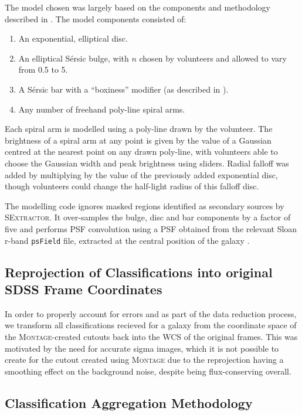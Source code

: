 \documentclass[../main.tex]{subfiles}
\begin{document}
The model chosen was largely based on the components and methodology described in \citet{galfit-paper}. The model components consisted of:
\begin{enumerate}
\item An exponential, elliptical disc.
\item An elliptical S\'ersic bulge, with $n$ chosen by volunteers and allowed to vary from 0.5 to 5.
\item A S\'ersic bar with a ``boxiness'' modifier (as described in \citealt{galfit-paper}).
\item Any number of freehand poly-line spiral arms.
\end{enumerate}

Each spiral arm is modelled using a poly-line drawn by the volunteer. The brightness of a spiral arm at any point is given by the value of a Gaussian centred at the nearest point on any drawn poly-line, with volunteers able to choose the Gaussian width and peak brightness using sliders. Radial falloff was added by multiplying by the value of the previously added exponential disc, though volunteers could change the half-light radius of this falloff disc.

The modelling code ignores masked regions identified as secondary sources by \textsc{SExtractor}. It over-samples the bulge, disc and bar components by a factor of five and performs PSF convolution using a PSF obtained from the relevant Sloan r-band \texttt{psField} file, extracted at the central position of the galaxy \citep{2002AJ....123..485S}.


\subsection{Reprojection of Classifications into original SDSS Frame Coordinates}

In order to properly account for errors and as part of the data reduction process, we transform all classifications recieved for a galaxy from the coordinate space of the \textsc{Montage}-created cutouts back into the WCS of the original frames. This was motivated by the need for accurate sigma images, which it is not possible to create for the cutout created using \textsc{Montage} due to the reprojection having a smoothing effect on the background noise, despite being flux-conserving overall.


\subsection{Classification Aggregation Methodology}
\end{document}
